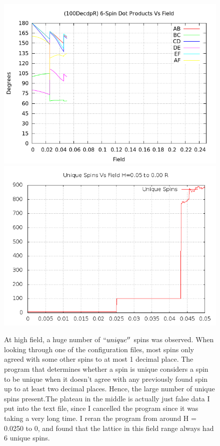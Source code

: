 \documentclass{article}
\begin{document}
\begin{figure}[ht]
\centering
\includegraphics[scale=0.5]{HVariedData/Pictures/100DecdpR.png}
\includegraphics[scale=0.5]{100/005to000RFreq.png}
\caption{At high field, a huge number of $``unique''$ spins was observed. When looking through one of the configuration
files, most spins only agreed with some other spins to at most 1 decimal place. The program that determines whether
a spin is unique considers a spin to be unique when it doesn't agree with any previously found spin up to at least two decimal 
places. Hence, the large number of unique spins present.The plateau in the middle is actually just false data I put
into the text file, since I cancelled the program since it was taking a very long time. I reran the program from around
H = 0.0250 to 0, and found that the lattice in this field range always had 6 unique spins.}
\end{figure}
\clearpage
\end{document}
